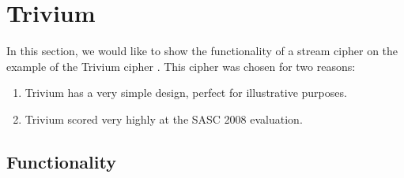 \section{Trivium}

In this section, we would like to show the functionality of a stream cipher on the example of the Trivium cipher \cite{canniere2008trivium}. This cipher was chosen for two reasons:
\begin{enumerate}
	\setlength\itemsep{0.1em}
	\item Trivium has a very simple design, perfect for illustrative purposes.
	\item Trivium scored very highly at the SASC 2008 evaluation.
\end{enumerate}

\subsection{Functionality}

